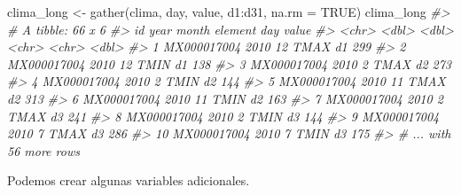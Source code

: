 \documentclass[
]{book}
\newenvironment{Shaded}{\begin{snugshade}}{\end{snugshade}}
\newcommand{\AttributeTok}[1]{\textcolor[rgb]{0.77,0.63,0.00}{#1}}
\newcommand{\CommentTok}[1]{\textcolor[rgb]{0.56,0.35,0.01}{\textit{#1}}}
\newcommand{\ConstantTok}[1]{\textcolor[rgb]{0.00,0.00,0.00}{#1}}
\newcommand{\FunctionTok}[1]{\textcolor[rgb]{0.00,0.00,0.00}{#1}}
\newcommand{\NormalTok}[1]{#1}
\newcommand{\OtherTok}[1]{\textcolor[rgb]{0.56,0.35,0.01}{#1}}
\newcommand{\SpecialCharTok}[1]{\textcolor[rgb]{0.00,0.00,0.00}{#1}}
\begin{document}
\begin{Shaded}
\begin{Highlighting}[]
\NormalTok{clima\_long }\OtherTok{\textless{}{-}} \FunctionTok{gather}\NormalTok{(clima, day, value, d1}\SpecialCharTok{:}\NormalTok{d31, }\AttributeTok{na.rm =} \ConstantTok{TRUE}\NormalTok{)}
\NormalTok{clima\_long}
\CommentTok{\#\textgreater{} \# A tibble: 66 x 6}
\CommentTok{\#\textgreater{}    id           year month element day   value}
\CommentTok{\#\textgreater{}    \textless{}chr\textgreater{}       \textless{}dbl\textgreater{} \textless{}dbl\textgreater{} \textless{}chr\textgreater{}   \textless{}chr\textgreater{} \textless{}dbl\textgreater{}}
\CommentTok{\#\textgreater{}  1 MX000017004  2010    12 TMAX    d1      299}
\CommentTok{\#\textgreater{}  2 MX000017004  2010    12 TMIN    d1      138}
\CommentTok{\#\textgreater{}  3 MX000017004  2010     2 TMAX    d2      273}
\CommentTok{\#\textgreater{}  4 MX000017004  2010     2 TMIN    d2      144}
\CommentTok{\#\textgreater{}  5 MX000017004  2010    11 TMAX    d2      313}
\CommentTok{\#\textgreater{}  6 MX000017004  2010    11 TMIN    d2      163}
\CommentTok{\#\textgreater{}  7 MX000017004  2010     2 TMAX    d3      241}
\CommentTok{\#\textgreater{}  8 MX000017004  2010     2 TMIN    d3      144}
\CommentTok{\#\textgreater{}  9 MX000017004  2010     7 TMAX    d3      286}
\CommentTok{\#\textgreater{} 10 MX000017004  2010     7 TMIN    d3      175}
\CommentTok{\#\textgreater{} \# ... with 56 more rows}
\end{Highlighting}
\end{Shaded}

Podemos crear algunas variables adicionales.
\end{document}
